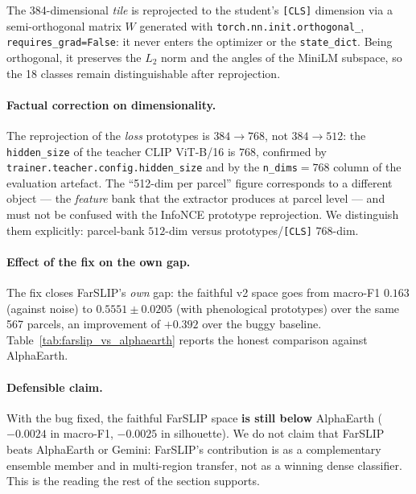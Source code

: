 The 384-dimensional \textit{tile} is reprojected to the student's
\texttt{[CLS]} dimension via a semi-orthogonal matrix $W$ generated with
\texttt{torch.nn.init.orthogonal\_}, \texttt{requires\_grad=False}: it never
enters the optimizer or the \texttt{state\_dict}. Being orthogonal, it preserves
the $L_2$ norm and the angles of the MiniLM subspace, so the 18 classes remain
distinguishable after reprojection.

\paragraph{Factual correction on dimensionality.}
The reprojection of the \textit{loss} prototypes is \textbf{$384\rightarrow768$},
not $384\rightarrow512$: the \texttt{hidden\_size} of the teacher CLIP ViT-B/16
is $768$, confirmed by \texttt{trainer.teacher.config.hidden\_size} and by the
\texttt{n\_dims}$=768$ column of the evaluation artefact. The ``512-dim per
parcel'' figure corresponds to a different object --- the \textit{feature} bank
that the extractor produces at parcel level --- and must not be confused with the
InfoNCE prototype reprojection. We distinguish them explicitly: parcel-bank
$512$-dim versus prototypes/\texttt{[CLS]} $768$-dim.

\paragraph{Effect of the fix on the own gap.}
The fix closes FarSLIP's \textit{own} gap: the faithful v2 space goes from
macro-F1 $0.163$ (against noise) to $0.5551 \pm 0.0205$ (with phenological
prototypes) over the same 567 parcels, an improvement of $+0.392$ over the buggy
baseline. Table~\ref{tab:farslip_vs_alphaearth} reports the honest comparison
against AlphaEarth.



\paragraph{Defensible claim.}
With the bug fixed, the faithful FarSLIP space \textbf{is still below} AlphaEarth
($-0.0024$ in macro-F1, $-0.0025$ in silhouette). We do not claim that FarSLIP
beats AlphaEarth or Gemini: FarSLIP's contribution is as a complementary ensemble
member and in multi-region transfer, not as a winning dense classifier. This is
the reading the rest of the section supports.

